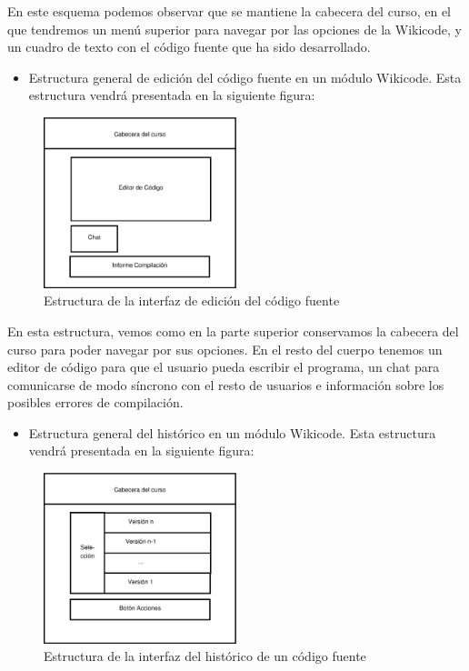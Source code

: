 En este esquema podemos observar que se mantiene la cabecera del curso, en el que tendremos un menú superior para navegar por las opciones de la Wikicode, y un cuadro de texto con el código fuente que ha sido desarrollado.

\begin{itemize}
	\item Estructura general de edición del código fuente en un módulo Wikicode. Esta estructura vendrá presentada en la siguiente figura:
\end{itemize}

\begin{figure}[h]
	\centering
	\includegraphics[width=0.5\textwidth]{./img/c3-edit.eps}
	\caption{Estructura de la interfaz de edición del código fuente}
\end{figure}

En esta estructura, vemos como en la parte superior conservamos la cabecera del curso para poder navegar por sus opciones. En el resto del cuerpo tenemos un editor de código para que el usuario pueda escribir el programa, un chat para comunicarse de modo síncrono con el resto de usuarios e información sobre los posibles errores de compilación.

\begin{itemize}
	\item Estructura general del histórico en un módulo Wikicode. Esta estructura vendrá presentada en la siguiente figura:
\end{itemize}

\begin{figure}[h]
	\centering
	\includegraphics[width=0.5\textwidth]{./img/c3-history.eps}
	\caption{Estructura de la interfaz del histórico de un código fuente}
\end{figure}

